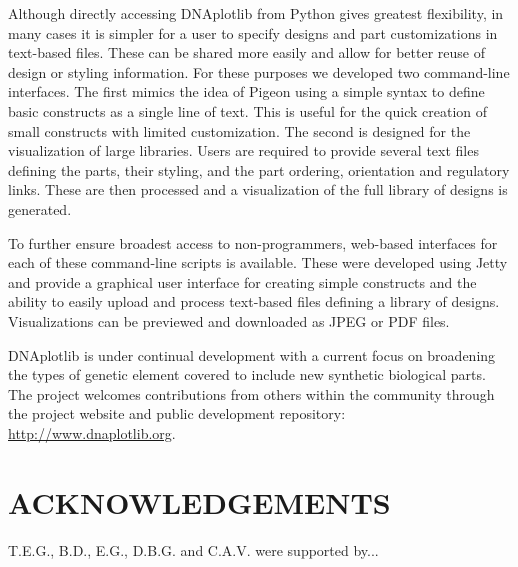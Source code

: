 \documentclass{bioinfo}
\begin{document}
Although directly accessing DNAplotlib from Python gives greatest flexibility, in many cases it is simpler for a user to specify designs and part customizations in text-based files. These can be shared more easily and allow for better reuse of design or styling information. For these purposes we developed two command-line interfaces. The first mimics the idea of Pigeon using a simple syntax to define basic constructs as a single line of text. This is useful for the quick creation of small constructs with limited customization. The second is designed for the visualization of large libraries. Users are required to provide several text files defining the parts, their styling, and the part ordering, orientation and regulatory links. These are then processed and a visualization of the full library of designs is generated.

To further ensure broadest access to non-programmers, web-based interfaces for each of these command-line scripts is available. These were developed using Jetty and provide a graphical user interface for creating simple constructs and the ability to easily upload and process text-based files defining a library of designs. Visualizations can be previewed and downloaded as JPEG or PDF files.

DNAplotlib is under continual development with a current focus on broadening the types of genetic element covered to include new synthetic biological parts. The project welcomes contributions from others within the community through the project website and public development repository: \href{http://www.dnaplotlib.org}{http://www.dnaplotlib.org}.

\section*{ACKNOWLEDGEMENTS}
T.E.G., B.D., E.G., D.B.G. and C.A.V. were supported by...
\end{document}
